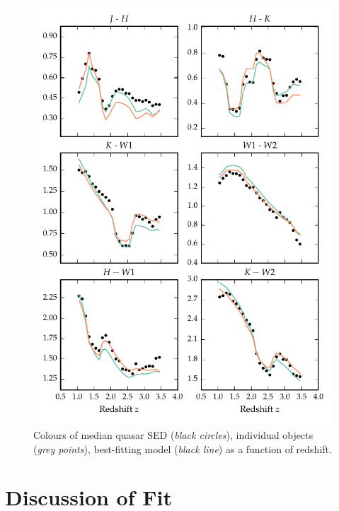 \begin{figure}
\includegraphics[width=\textwidth]{figures/chapter05/sed_color_plot_2.pdf}
\caption[{Colours of median quasar SED, individual objects, best-fitting  model as a function of redshift.}]{Colours of median quasar SED ({\it black circles}), individual objects ({\it grey points}), best-fitting  model ({\it black line}) as a function of redshift.}
  \label{fig:color_2}
\end{figure} 

\section{Discussion of Fit}

